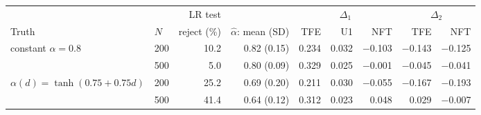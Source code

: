 \small
\begin{tabular}{@{}llrrrrrrr@{}}
\toprule
& & LR test & & \multicolumn{3}{c}{$\Delta_1$} & \multicolumn{2}{c}{$\Delta_2$}\\
\cmidrule(lr){5-7}\cmidrule(l){8-9}
Truth & $N$ & reject (\%) & $\hat\alpha$: mean (SD) & TFE & U1 & NFT & TFE & NFT\\
\midrule
constant $\alpha=0.8$ & 200 & 10.2 & 0.82 (0.15) & 0.234 & 0.032 & \ensuremath{-}0.103 & \ensuremath{-}0.143 & \ensuremath{-}0.125\\
 & 500 & 5.0 & 0.80 (0.09) & 0.329 & 0.025 & \ensuremath{-}0.001 & \ensuremath{-}0.045 & \ensuremath{-}0.041\\
$\alpha(d)=\tanh(0.75+0.75d)$ & 200 & 25.2 & 0.69 (0.20) & 0.211 & 0.030 & \ensuremath{-}0.055 & \ensuremath{-}0.167 & \ensuremath{-}0.193\\
 & 500 & 41.4 & 0.64 (0.12) & 0.312 & 0.023 & 0.048 & 0.029 & \ensuremath{-}0.007\\
\bottomrule
\end{tabular}
